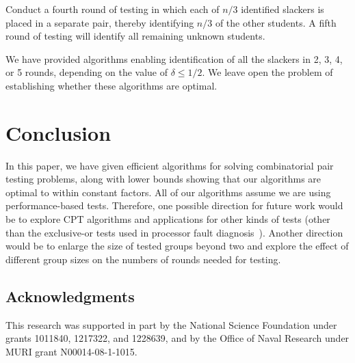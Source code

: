 \documentclass[11pt]{llncs}
\let\realsubsection\subsection
\let\realsubsection\subsection
\renewcommand{\subsection}[1]{\paragraph{\bf #1.}}
\begin{document}
Conduct a fourth round of testing in which each of $n/3$ identified slackers is
placed in a separate pair, thereby identifying $n/3$ of the other students.
A fifth round of testing will identify all remaining unknown students.

We have provided algorithms enabling identification of
all the slackers in 2, 3, 4, or 5 rounds, depending on the value of $\delta\le 1/2$.
We leave open the problem of establishing whether these algorithms are optimal.
 \fi

\section{Conclusion}
In this paper, we have given efficient algorithms for solving combinatorial
pair testing problems, along with lower bounds showing that our algorithms
are optimal to within constant factors.
All of our algorithms assume we are using performance-based tests.
Therefore,
one possible direction for future work would be to explore CPT algorithms
and applications for other kinds of tests (other than the exclusive-or
tests used in 
processor fault 
diagnosis~\cite{bhk-95,Beigel:1989,Beigel:1993,Blecher1983107,Pelc:1998}). Another direction would be to enlarge the size of tested groups beyond two and explore the effect of different group sizes on the numbers of rounds needed for testing.

\realsubsection*{Acknowledgments} 
This research was supported in part by
the National Science Foundation under grants 1011840, 1217322, 
and 1228639, and by the Office of
Naval Research under MURI grant N00014-08-1-1015.

{\raggedright 
 
 
}

\clearpage
\end{document}
